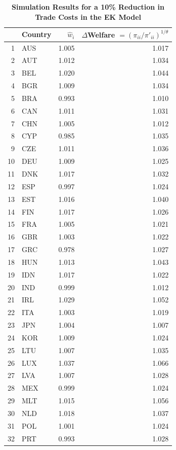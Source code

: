 \documentclass[12pt]{article}
\begin{document}
\begin{table}[!htpb]
\centering
\caption{\textbf{Simulation Results for a 10\% Reduction in Trade Costs in the EK Model}}
\begin{tabular}{rlrr}
  \hline
 & Country & $\hat w_i$ & $\Delta$Welfare $=(\pi_{ii}/\pi'_{ii})^{1/\theta}$\\ 
  \hline
1 & AUS & 1.005 & 1.017 \\ 
  2 & AUT & 1.012 & 1.034 \\ 
  3 & BEL & 1.020 & 1.044 \\ 
  4 & BGR & 1.009 & 1.034 \\ 
  5 & BRA & 0.993 & 1.010 \\ 
  6 & CAN & 1.011 & 1.031 \\ 
  7 & CHN & 1.005 & 1.012 \\ 
  8 & CYP & 0.985 & 1.035 \\ 
  9 & CZE & 1.011 & 1.036 \\ 
  10 & DEU & 1.009 & 1.025 \\ 
  11 & DNK & 1.017 & 1.032 \\ 
  12 & ESP & 0.997 & 1.024 \\ 
  13 & EST & 1.016 & 1.040 \\ 
  14 & FIN & 1.017 & 1.026 \\ 
  15 & FRA & 1.005 & 1.021 \\ 
  16 & GBR & 1.003 & 1.022 \\ 
  17 & GRC & 0.978 & 1.027 \\ 
  18 & HUN & 1.013 & 1.043 \\ 
  19 & IDN & 1.017 & 1.022 \\ 
  20 & IND & 0.999 & 1.012 \\ 
  21 & IRL & 1.029 & 1.052 \\ 
  22 & ITA & 1.003 & 1.019 \\ 
  23 & JPN & 1.004 & 1.007 \\ 
  24 & KOR & 1.009 & 1.024 \\ 
  25 & LTU & 1.007 & 1.035 \\ 
  26 & LUX & 1.037 & 1.066 \\ 
  27 & LVA & 1.007 & 1.028 \\ 
  28 & MEX & 0.999 & 1.024 \\ 
  29 & MLT & 1.015 & 1.056 \\ 
  30 & NLD & 1.018 & 1.037 \\ 
  31 & POL & 1.001 & 1.024 \\ 
  32 & PRT & 0.993 & 1.028 \\ 

\end{tabular}
\end{table}
\end{document}
